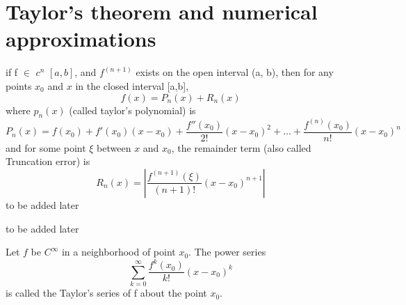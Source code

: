 \documentclass[../Main.tex]{subfiles}
\begin{document}


\section{Taylor's theorem and numerical approximations}

{ if f $\in$ $c^n$ $[a,b]$, and $f^{(n+1)}$ exists on the open interval (a, b), then for any points $x_0$ and $x$ in the closed interval [a,b],
\begin{equation}
f(x) = P_n(x) + R_n(x)
\end{equation}
where $p_n(x)$ (called taylor's polynomial) is
\begin{equation}
P_n(x) = f(x_0) + f'(x_0)(x-x_0) + \frac{f''(x_0)}{2!}(x-x_0)^2 + \dots + \frac{f^{(n)}(x_0)}{n!}(x-x_0)^n
\end{equation}
and for some point $\xi$ between $x$ and $x_0$, the remainder term (also called Truncation error) is
\begin{equation}
R_n(x) = \left |{\frac{f^{(n+1)}(\xi)}{(n+1)!}(x-x_0)^{n+1}}\right |
\end{equation}
}{to be added later}


{ to be added later}

{Let $f$ be $C^\infty$ in a neighborhood of point $x_0$. The power series
\begin{equation}
   \sum_{k=0}^{\infty} \frac{f^k(x_0)}{k!}(x-x_0)^k
\end{equation}
is called the Taylor's series of f about the point $x_0$.
}
\end{document}
